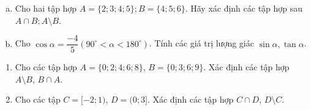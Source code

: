 \begin{bt}%
	\begin{enumerate}[a)]
		\item Cho hai tập hợp $A=\{2;3;4;5\} ; B=\{4;5;6\}$. Hãy xác định các tập hợp sau $A \cap B ; A \setminus B$.
		\item Cho $\cos \alpha=\dfrac{-4}{5}\left(90^{\circ}<\alpha<180^{\circ}\right)$. Tính các giá trị lượng giác $\sin \alpha, \tan \alpha$.
	\end{enumerate}
\end{bt}

\begin{bt}%
	\begin{enumerate}
		\item Cho các tập hợp  $A=\{0 ; 2 ; 4 ; 6 ; 8\}$, $B=\{0 ; 3 ; 6 ; 9\}$. Xác định các tập hợp $A \setminus B$, $B \cap A$.
		\item Cho các tập $C=[-2 ; 1)$, $D=(0 ; 3]$. Xác định các tập hợp $C \cap D$, $D\setminus C$.
	\end{enumerate}
\end{bt}

